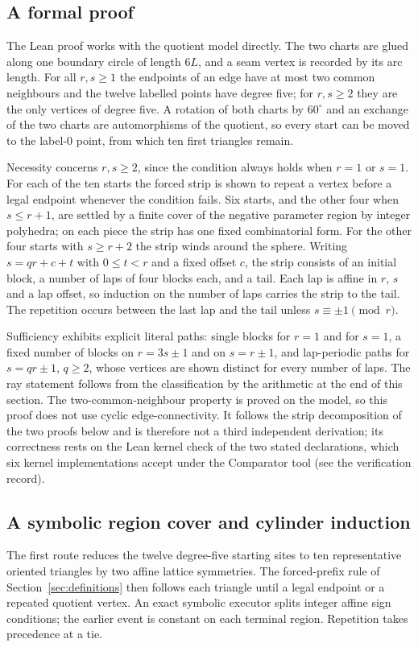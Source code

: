 \documentclass[11pt]{amsart}
\theoremstyle{definition}\newtheorem{definition}{Definition}
\begin{document}
\subsection{A formal proof}\label{sec:d12-lean}
The Lean proof works with the quotient model directly. The two charts
are glued along one boundary circle of length $6L$, and a seam vertex
is recorded by its arc length. For all $r,s\ge1$ the endpoints of an
edge have at most two common neighbours and the twelve labelled points
have degree five; for $r,s\ge2$ they are the only vertices of degree
five. A rotation of
both charts by $60^\circ$ and an exchange of the two charts are
automorphisms of the quotient, so every start can be moved to the
label-$0$ point, from which ten first triangles remain.

Necessity concerns $r,s\ge2$, since the condition always holds when
$r=1$ or $s=1$. For each of the ten starts the forced strip is shown to
repeat a vertex before a legal endpoint whenever the condition fails.
Six starts, and the other four when $s\le r+1$, are settled by a finite
cover of the negative parameter region by integer polyhedra; on each
piece the strip has one fixed combinatorial form. For the other four
starts with $s\ge r+2$ the strip winds around the sphere. Writing
$s=qr+c+t$ with $0\le t<r$ and a fixed offset $c$, the strip consists of
an initial block, a number of laps of four blocks each, and a tail. Each
lap is affine in $r$, $s$ and a lap offset, so induction on the number
of laps carries the strip to the tail. The repetition occurs between
the last lap and the tail unless $s\equiv\pm1\pmod r$.

Sufficiency exhibits explicit literal paths: single blocks for $r=1$
and for $s=1$, a fixed number of blocks on $r=3s\pm1$ and on $s=r\pm1$,
and lap-periodic paths for $s=qr\pm1$, $q\ge2$, whose vertices are
shown distinct for every number of laps. The ray statement follows from
the classification by the arithmetic at the end of this section. The
two-common-neighbour property is proved on the model, so this proof
does not use cyclic edge-connectivity. It follows the strip
decomposition of the two proofs below and is therefore not a third
independent derivation; its correctness rests on the Lean kernel
check of the two stated declarations, which six kernel implementations
accept under the Comparator tool (see the verification record).

\subsection{A symbolic region cover and cylinder induction}
The first route reduces the twelve degree-five starting sites to ten
representative oriented triangles by two affine lattice symmetries.
The forced-prefix rule of Section~\ref{sec:definitions} then follows
each triangle until a legal endpoint or a repeated quotient vertex.
An exact symbolic executor splits integer affine sign conditions;
the earlier event is constant on each terminal region. Repetition
takes precedence at a tie.
\end{document}
